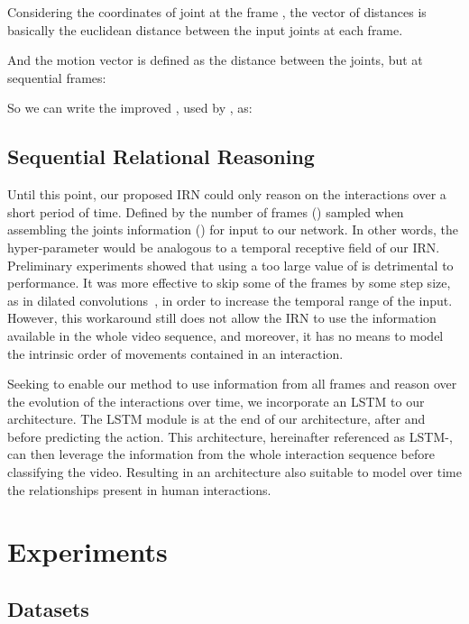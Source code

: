 \documentclass[journal,twoside]{IEEEtran}
\begin{document}
Considering  the coordinates of joint  at the frame , the vector of distances is basically the euclidean distance between the input joints at each frame.



And the motion vector is defined as the distance between the joints, but at sequential frames:



So we can write the improved , used by , as: 



\subsection{Sequential Relational Reasoning}

Until this point, our proposed IRN could only reason on the interactions over a short period of time.
Defined by the number of frames () sampled when assembling the joints information () for input to our network.
In other words, the hyper-parameter  would be analogous to a temporal receptive field of our IRN.
Preliminary experiments showed that using a too large value of  is detrimental to performance.
It was more effective to skip some of the frames by some step size, as in dilated convolutions~\cite{Yu2016}, in order to increase the temporal range of the input.
However, this workaround still does not allow the IRN to use the information available in the whole video sequence, and moreover, it has no means to model the intrinsic order of movements contained in an interaction.

Seeking to enable our method to use information from all frames and reason over the evolution of the interactions over time, we incorporate an LSTM to our architecture. The LSTM module is at the end of our architecture, after  and before predicting the action.
This architecture, hereinafter referenced as LSTM-, can then leverage the information from the whole interaction sequence before classifying the video.
Resulting in an architecture also suitable to model over time the relationships present in human interactions.




 \section{Experiments}
\label{sec:experiments}


\subsection{Datasets}
\end{document}
